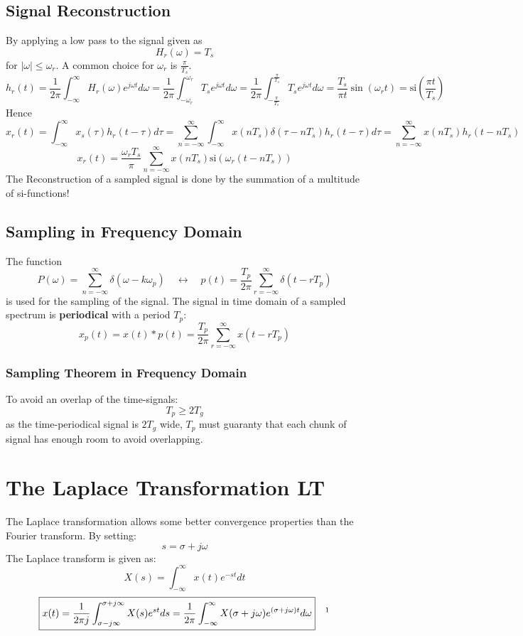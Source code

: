 \documentclass[10pt,a4paper]{article}
\begin{document}
\subsection{Signal Reconstruction}
By applying a low pass to the signal given as $$H_r(\omega) = T_s$$ for $\vert \omega \vert \leq \omega_r$. A common choice for $\omega_r$ is $\frac{\pi}{T_s}$.
$$
h_r(t) = \frac{1}{2\pi} \int_{-\infty}^{\infty} H_r(\omega)e^{j\omega t} d\omega
	   = \frac{1}{2\pi} \int_{-\omega_r}^{\omega_r} T_se^{j\omega t} d\omega
	   = \frac{1}{2\pi} \int_{-\frac{\pi}{T_s}}^{\frac{\pi}{T_s}} T_se^{j\omega t} d\omega
	   = \frac{T_s}{\pi t} \sin(\omega_r t)
	   = \text{si}(\frac{\pi t}{T_s})
$$
Hence
$$
x_r(t) = \int_{-\infty}^{\infty} x_s(\tau) h_r(t-\tau)d\tau
	   = \sum_{n=-\infty}^{\infty} \int_{-\infty}^{\infty} x(nT_s) \delta(\tau-nT_s)h_r(t-\tau) d\tau
	   = \sum_{n=-\infty}^{\infty} x(nT_s) h_r(t-nT_s)
$$
$$
\boxed{
x_r(t) = \frac{\omega_rT_s}{\pi} \sum_{n=-\infty}^{\infty} x(nT_s) \text{si}(\omega_r(t-nT_s))
}
$$
The Reconstruction of a sampled signal is done by the summation of a multitude of si-functions!

\subsection{Sampling in Frequency Domain}
The function 
$$
P(\omega) = \sum_{n=-\infty}^{\infty} \delta(\omega-k\omega_p) \quad
\leftrightarrow \quad
p(t) = \frac{T_p}{2\pi} \sum_{r=-\infty}^{\infty} \delta(t-rT_p)
$$
is used for the sampling of the signal. The signal in time domain of a sampled spectrum is \textbf{periodical} with a period $T_p$:
$$
x_p(t) = x(t) * p(t) = \frac{T_p}{2\pi} \sum_{r=-\infty}^{\infty} x(t - rT_p)
$$
\subsubsection{Sampling Theorem in Frequency Domain}
To avoid an overlap of the time-signals:
$$
\boxed{ T_p \geq 2T_g }
$$
as the time-periodical signal is $2T_g$ wide, $T_p$ must guaranty that each chunk of signal has enough room to avoid overlapping. 

\section{The Laplace Transformation LT}
The Laplace transformation allows some better convergence properties than the Fourier transform. By setting:
$$
s = \sigma + j\omega 
$$
The Laplace transform is given as:
$$
\boxed{
X(s) = \int_{-\infty}^{\infty} x(t)e^{-st}dt}
$$
$$
\boxed{
x(t) = \frac{1}{2\pi j} \int_{\sigma-j\infty}^{\sigma+j\infty} X(s)e^{st}ds
	 = \frac{1}{2\pi} \int_{-\infty}^{\infty} X(\sigma + j\omega)e^{(\sigma + j\omega)t}d\omega}
\quad \textbf{\footnotemark}
$$
\end{document}
